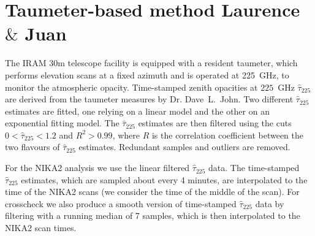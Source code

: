 \section{Taumeter-based method {\color{YellowGreen} Laurence $\&$ Juan}}
\label{se:taumeter-method}

The IRAM 30m telescope facility is equipped with a resident taumeter, which performs
elevation scans at a fixed azimuth and is operated at 225~GHz, to
monitor the atmospheric opacity.
Time-stamped zenith opacities at $225$~GHz $\hat{\tau}_{225}$ are derived from the
taumeter measures by Dr. Dave~L.~John. Two different $\hat{\tau}_{225}$
estimates are fitted, one relying on a linear model and the other on
an exponential fitting model. The $\hat{\tau}_{225}$ estimates are then
filtered using the cuts $0< \hat{\tau}_{225} <1.2$ and $R^2 > 0.99$, where
$R$ is the correlation coefficient between the two flavours of
$\hat{\tau}_{225}$ estimates. Redundant samples and outliers are removed.

For the NIKA2 analysis we use the linear filtered  $\hat{\tau}_{225}$ data.
The time-stamped $\hat{\tau}_{225}$ estimates, which are sampled about
every 4 minutes, are interpolated to the time of the NIKA2 scans (we
consider the time of the middle of the scan). For crosscheck we also
produce a smooth version of time-stamped $\hat{\tau}_{225}$ data by
filtering with a running median of 7 samples, which is then
interpolated to the NIKA2 scan times.


